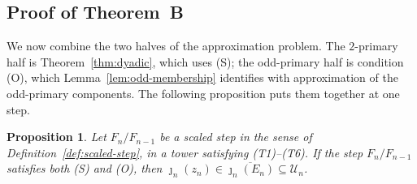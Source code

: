 \documentclass[11pt]{article}
\theoremstyle{plain}
\newtheorem{proposition}[theorem]{Proposition}
\theoremstyle{definition}
\theoremstyle{remark}
\begin{document}
\subsection{Proof of Theorem~B}\label{sec:odd-assembly}
We now combine the two halves of the approximation problem.  The
$2$-primary half is Theorem~\ref{thm:dyadic}, which uses (S); the
odd-primary half is condition (O), which Lemma~\ref{lem:odd-membership}
identifies with approximation of the odd-primary components.  The
following proposition puts them together at one step.

\begin{proposition}\label{prop:assembly}
Let $F_n/F_{n-1}$ be a scaled step in the sense of
Definition~\ref{def:scaled-step}, in a tower satisfying
\textup{(T1)--(T6)}.  If the step $F_n/F_{n-1}$ satisfies both
\textup{(S)} and \textup{(O)}, then
$\jmath_n(z_n)\in\overline{\jmath_n(E_n)}\subseteq\mathcal U_n$.
\end{proposition}
\end{document}
